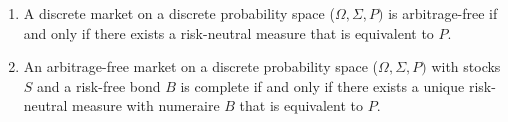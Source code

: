     \begin{theorem}
        \begin{enumerate}
            \item A discrete market on a discrete probability space ($\Omega,\Sigma,P)$ is arbitrage-free if and only if there exists a risk-neutral measure that is equivalent to $P$.
            \item An arbitrage-free market on a discrete probability space ($\Omega,\Sigma,P)$ with stocks $S$ and a risk-free bond $B$ is complete if and only if there exists a unique risk-neutral measure with numeraire $B$ that is equivalent to $P$.
        \end{enumerate}
    \end{theorem}

    \begin{theorem}
        
    \end{theorem}
